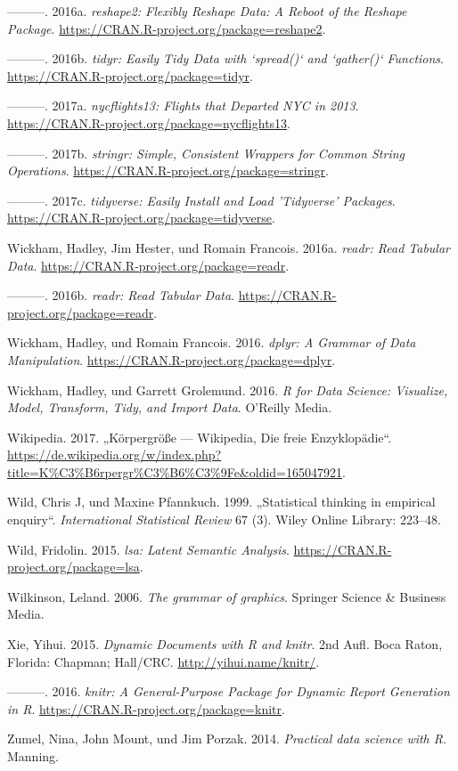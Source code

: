 \documentclass[12pt,ngerman,]{book}
\theoremstyle{definition}
\theoremstyle{definition}
\theoremstyle{remark}
\begin{document}
\hypertarget{ref-R-reshape2}{}
---------. 2016a. \emph{reshape2: Flexibly Reshape Data: A Reboot of the
Reshape Package}. \url{https://CRAN.R-project.org/package=reshape2}.

\hypertarget{ref-R-tidyr}{}
---------. 2016b. \emph{tidyr: Easily Tidy Data with `spread()` and
`gather()` Functions}. \url{https://CRAN.R-project.org/package=tidyr}.

\hypertarget{ref-R-nycflights13}{}
---------. 2017a. \emph{nycflights13: Flights that Departed NYC in
2013}. \url{https://CRAN.R-project.org/package=nycflights13}.

\hypertarget{ref-R-stringr}{}
---------. 2017b. \emph{stringr: Simple, Consistent Wrappers for Common
String Operations}. \url{https://CRAN.R-project.org/package=stringr}.

\hypertarget{ref-R-tidyverse}{}
---------. 2017c. \emph{tidyverse: Easily Install and Load 'Tidyverse'
Packages}. \url{https://CRAN.R-project.org/package=tidyverse}.

\hypertarget{ref-R-readr}{}
Wickham, Hadley, Jim Hester, und Romain Francois. 2016a. \emph{readr:
Read Tabular Data}. \url{https://CRAN.R-project.org/package=readr}.

\hypertarget{ref-readr}{}
---------. 2016b. \emph{readr: Read Tabular Data}.
\url{https://CRAN.R-project.org/package=readr}.

\hypertarget{ref-R-dplyr}{}
Wickham, Hadley, und Romain Francois. 2016. \emph{dplyr: A Grammar of
Data Manipulation}. \url{https://CRAN.R-project.org/package=dplyr}.

\hypertarget{ref-r4ds}{}
Wickham, Hadley, und Garrett Grolemund. 2016. \emph{R for Data Science:
Visualize, Model, Transform, Tidy, and Import Data}. O'Reilly Media.

\hypertarget{ref-wiki:groesse}{}
Wikipedia. 2017. „Körpergröße --- Wikipedia, Die freie Enzyklopädie``.
\url{https://de.wikipedia.org/w/index.php?title=K\%C3\%B6rpergr\%C3\%B6\%C3\%9Fe\&oldid=165047921}.

\hypertarget{ref-wild1999statistical}{}
Wild, Chris J, und Maxine Pfannkuch. 1999. „Statistical thinking in
empirical enquiry``. \emph{International Statistical Review} 67 (3).
Wiley Online Library: 223--48.

\hypertarget{ref-R-lsa}{}
Wild, Fridolin. 2015. \emph{lsa: Latent Semantic Analysis}.
\url{https://CRAN.R-project.org/package=lsa}.

\hypertarget{ref-wilkinson2006grammar}{}
Wilkinson, Leland. 2006. \emph{The grammar of graphics}. Springer
Science \& Business Media.

\hypertarget{ref-xie2015}{}
Xie, Yihui. 2015. \emph{Dynamic Documents with R and knitr}. 2nd Aufl.
Boca Raton, Florida: Chapman; Hall/CRC. \url{http://yihui.name/knitr/}.

\hypertarget{ref-R-knitr}{}
---------. 2016. \emph{knitr: A General-Purpose Package for Dynamic
Report Generation in R}. \url{https://CRAN.R-project.org/package=knitr}.

\hypertarget{ref-zumel2014practical}{}
Zumel, Nina, John Mount, und Jim Porzak. 2014. \emph{Practical data
science with R}. Manning.

\printindex

\backmatter
\end{document}
